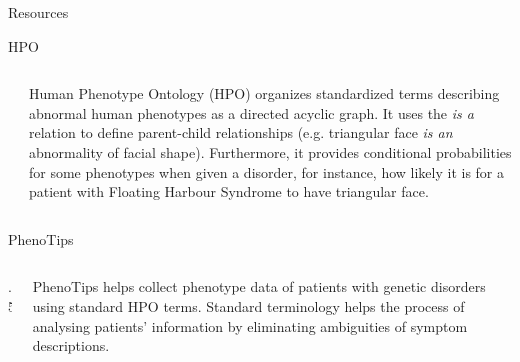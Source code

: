 \documentclass[final]{beamer} %
\begin{document}
\begin{frame}{}
\begin{columns}[T]
\begin{column}{0.3\linewidth}
\begin{block}{\Huge Resources}
\begin{block}{\Large HPO}
\begin{columns}[T]
\begin{column}{.5\textwidth}
     \end{column}
     \begin{column}{.5\textwidth}
      \Large
      Human Phenotype Ontology (HPO) organizes standardized terms describing abnormal human phenotypes as a directed acyclic graph. It uses the  {\it{\Large is a}} relation to define parent-child relationships (e.g. triangular face {\it{\Large is an}} abnormality of facial shape). Furthermore, it provides conditional probabilities for some phenotypes when given a disorder, for instance, how likely it is for a patient with Floating Harbour Syndrome to have triangular face. 
     \end{column}
   \end{columns}
  \end{block}
  

   \begin{block}{\Large PhenoTips}
      \begin{columns}[T]
        \begin{column} {.5\textwidth}
           \vspace{4cm}
           \centering
        \end{column}
        
        \begin{column}{.5\textwidth}
          \Large
          PhenoTips helps collect phenotype data of patients with genetic disorders using standard HPO terms. Standard terminology helps the process of analysing patients' information by eliminating ambiguities of symptom descriptions.
        \end{column}
      \end{columns}
    \end{block}

   \end{block}


\end{column}
\end{columns}
\end{frame}
\end{document}
